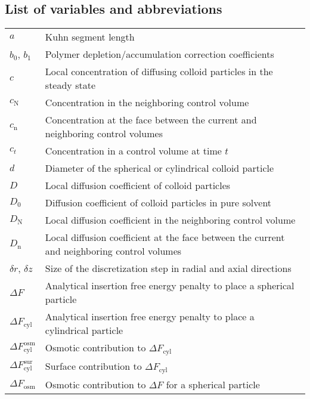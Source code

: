 \documentclass[10pt, a4paper]{article}
\begin{document}
\pagebreak
\subsection*{List of variables and abbreviations}

\begin{tabularx}{\linewidth}{l X}
    $a$ & Kuhn segment length \\
    $b_0$, $b_1$ & Polymer depletion/accumulation correction coefficients \\
    $c$ & Local concentration of diffusing colloid particles in the steady state \\
    $c_{\textrm{N}}$ & Concentration in the neighboring control volume \\
    $c_{\textrm{n}}$ & Concentration at the face between the current and neighboring control volumes \\
    $c_{t}$ & Concentration in a control volume at time $t$ \\
    $d$ & Diameter of the spherical or cylindrical colloid particle \\
    $D$ & Local diffusion coefficient of colloid particles \\
    $D_0$ & Diffusion coefficient of colloid particles in pure solvent \\
    $D_{\textrm{N}}$ & Local diffusion coefficient in the neighboring control volume \\
    $D_{\textrm{n}}$ & Local diffusion coefficient at the face between the current and neighboring control volumes \\
    $\delta r$, $\delta z$ & Size of the discretization step in radial and axial directions \\
    $\Delta F$ & Analytical insertion free energy penalty to place a spherical particle \\
    $\Delta F_{\textrm{cyl}}$ & Analytical insertion free energy penalty to place a cylindrical particle \\
    $\Delta F_{\textrm{cyl}}^{\textrm{osm}}$ & Osmotic contribution to $\Delta F_{\textrm{cyl}}$ \\
    $\Delta F_{\textrm{cyl}}^{\textrm{sur}}$ & Surface contribution to $\Delta F_{\textrm{cyl}}$ \\
    $\Delta F_{\textrm{osm}}$ & Osmotic contribution to $\Delta F$ for a spherical particle\\

\end{tabularx}
\end{document}
